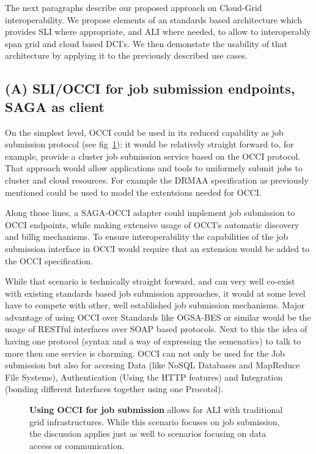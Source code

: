 \documentclass[10pt,conference,final,letterpaper,twoside,twocolumn,]{IEEEtran}
\newcommand{\B}[1]{\textbf{#1}}
\begin{document}
The next paragraphs describe our proposed approach on Cloud-Grid
interoperability. We propose elements of an standards based
architecture which provides SLI where appropriate, and ALI where
needed, to allow to interoperably span grid and cloud based DCI's.  We
then demonstate the usability of that architecture by applying it to
the previously described use cases.

\subsection{(A) SLI/OCCI for job submission endpoints, SAGA as client}

On the simplest level, OCCI could be used in its reduced capability as
job submission protocol (see fig~\ref{fig:arch1}): it would be
relatively straight forward to, for example, provide a cluster job
submission service based on the OCCI protocol. That approach would
allow applications and tools to uniformely submit jobs to cluster and
cloud resources. For example the DRMAA specification as previously
mentioned could be used to model the extentsions needed for OCCI.

Along those lines, a SAGA-OCCI adapter could implement job submission
to OCCI endpoints, while making extensive usage of OCCI's automatic
discovery and billig mechanisms. To ensure interoperability the
capabilities of the job submission interface in OCCI would require
that an extension would be added to the OCCI specification.

While that scenario is technically straight forward, and can very well
co-exist with existing standards based job submission approaches, it
would at some level have to compete with other, well established job
submission mechanisms. Major advantage of using OCCI over Standards
like OGSA-BES or similar would be the usage of RESTful interfaces over
SOAP based protocols. Next to this the idea of having one protocol
(syntax and a way of expressing the semenatics) to talk to more then
one service is charming. OCCI can not only be used for the Job
submission but also for accesing Data (like NoSQL Databases and
MapReduce File Systems), Authentication (Using the HTTP features) and
Integration (bonding different Interfaces together using one
Procotol).

\begin{figure}[htb]
 \caption{\footnotesize\label{fig:arch1} \B{Using OCCI for job 
    submission} allows for ALI with traditional grid infrastructures.  
    While this scenario focuses on job submission, the discussion 
    applies just as well to scenarios focusing on data access or 
    communication.}
\end{figure}
\end{document}
